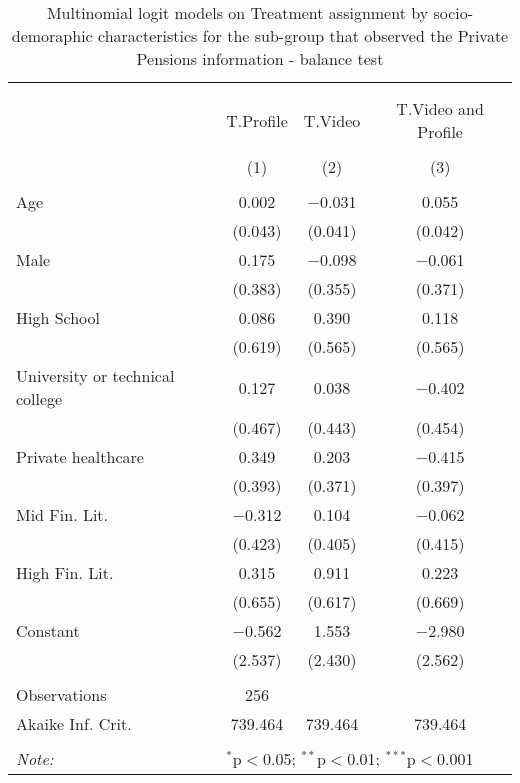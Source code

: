 
\begin{table}[H] \centering 
  \caption{Multinomial logit models on Treatment assignment by socio-demoraphic characteristics for the sub-group that observed the Private Pensions information  - balance test} 
  \label{tbl:balance_private_online} 
\begin{tabular}{@{\extracolsep{5pt}}lccc} 
\\[-1.8ex]\hline 
\hline \\[-1.8ex] 
\\[-1.8ex] & T.Profile & T.Video & T.Video and Profile \\ 
\\[-1.8ex] & (1) & (2) & (3)\\ 
\hline \\[-1.8ex] 
 Age & 0.002 & $-$0.031 & 0.055 \\ 
  & (0.043) & (0.041) & (0.042) \\ 
  Male & 0.175 & $-$0.098 & $-$0.061 \\ 
  & (0.383) & (0.355) & (0.371) \\ 
  High School & 0.086 & 0.390 & 0.118 \\ 
  & (0.619) & (0.565) & (0.565) \\ 
  University or technical college & 0.127 & 0.038 & $-$0.402 \\ 
  & (0.467) & (0.443) & (0.454) \\ 
  Private healthcare & 0.349 & 0.203 & $-$0.415 \\ 
  & (0.393) & (0.371) & (0.397) \\ 
  Mid Fin. Lit. & $-$0.312 & 0.104 & $-$0.062 \\ 
  & (0.423) & (0.405) & (0.415) \\ 
  High Fin. Lit. & 0.315 & 0.911 & 0.223 \\ 
  & (0.655) & (0.617) & (0.669) \\ 
  Constant & $-$0.562 & 1.553 & $-$2.980 \\ 
  & (2.537) & (2.430) & (2.562) \\ 
 \hline \\[-1.8ex] 
Observations & 256 &  &  \\ 
Akaike Inf. Crit. & 739.464 & 739.464 & 739.464 \\ 
\hline 
\hline \\[-1.8ex] 
\textit{Note:}  & \multicolumn{3}{l}{$^{*}$p$<$0.05; $^{**}$p$<$0.01; $^{***}$p$<$0.001} \\ 
\end{tabular} 
\end{table} 
